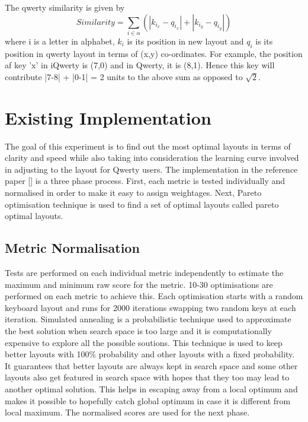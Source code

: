 \documentclass[MTech]{iitmdiss}
\begin{document}
The qwerty similarity is given by
\begin{equation}
Similarity = \sum_{i \in \alpha} (|k_{i_{x}}-q_{i_{x}}| + |k_{i_{y}}-q_{i_{y}}|)
\end{equation}
where i is a letter in alphabet,  $k_{i}$ is its position in new layout and $q_{i}$ is its position in qwerty layout in terms of (x,y) co-ordinates. For example, the position af key 'x' in iQwerty is (7,0) and in Qwerty, it is (8,1). Hence this key will contribute |7-8| + |0-1| = 2 units to the above sum as opposed to $\sqrt{2}$. 

\chapter{Existing Implementation}
The goal of this experiment is to find out the most optimal layouts in terms of clarity and speed while also taking into consideration the learning curve involved in adjusting to the layout for Qwerty users.
The implementation in the reference paper [\cite{gesturerecog}] is a three phase process. First, each metric is tested individually and normalised in order to make it easy to assign weightages. Next, Pareto optimisation technique is used to find a set of optimal layouts called pareto optimal layouts.

\section{Metric Normalisation}
Tests are performed on each individual metric independently to estimate the maximum and minimum raw score for the metric.
10-30 optimisations are performed on each metric to achieve this.
Each optimisation starts with a random keyboard layout and runs for 2000 iterations swapping two random keys at each iteration.
Simulated annealing is a probabilistic technique used to approximate the best solution when search space is too large and it is computationally expensive to explore all the possible soutions. This technique is used to keep better layouts with 100\% probability and other layouts with a fixed probability. It guarantees that better layouts are always kept in search space and some other layouts also get featured in search space with hopes that they too may lead to another optimal solution. This helps in escaping away from a local optimum and makes it possible to hopefully catch global optimum in case it is different from local maximum.
The normalised scores are used for the next phase.
\end{document}
